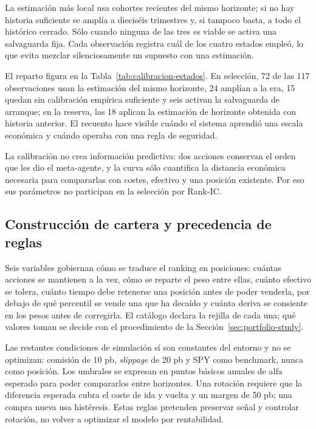 La estimación más local usa cohortes recientes del mismo horizonte; si no hay historia suficiente se
amplía a dieciséis trimestres y, si tampoco basta, a todo el histórico cerrado. Sólo cuando ninguna
de las tres es viable se activa una salvaguarda fija. Cada observación registra cuál de los cuatro
estados empleó, lo que evita mezclar silenciosamente un supuesto con una estimación.

\begin{table}[htbp]
  \centering
  \small
  \caption{Frecuencia de los estados de calibración por ventana.}
  \label{tab:calibracion-estados}
  
\end{table}

El reparto figura en la Tabla~\ref{tab:calibracion-estados}. En selección, 72 de las 117
observaciones usan la estimación del mismo horizonte, 24 amplían a la era, 15 quedan sin calibración
empírica suficiente y seis activan la salvaguarda de arranque; en la
reserva, las 18 aplican la estimación de horizonte obtenida con historia anterior. El recuento hace
visible cuándo el sistema aprendió una escala económica y cuándo operaba con una regla de seguridad.

La calibración no crea información predictiva: dos acciones conservan el orden que les dio el
meta-agente, y la curva sólo cuantifica la distancia económica necesaria para compararlas con
costes, efectivo y una posición existente. Por eso sus parámetros no participan en la selección por
Rank-IC.

\subsection{Construcción de cartera y precedencia de reglas}

Seis variables gobiernan cómo se traduce el ranking en posiciones: cuántas acciones se mantienen a
la vez, cómo se reparte el peso entre ellas, cuánto efectivo se tolera, cuánto tiempo debe retenerse
una posición antes de poder venderla, por debajo de qué percentil se vende una que ha decaído y
cuánta deriva se consiente en los pesos antes de corregirla. El catálogo declara la rejilla de cada
una; qué valores toman se decide con el procedimiento de la Sección~\ref{sec:portfolio-study}.

Las restantes condiciones de simulación sí son constantes del entorno y no se optimizan: comisión de
10 pb, \textit{slippage} de 20 pb y SPY como benchmark, nunca como posición. Los umbrales se expresan
en puntos básicos anuales de alfa esperado para poder compararlos entre horizontes. Una rotación
requiere que la diferencia esperada cubra el coste de ida y vuelta y un margen de 50 pb; una compra
nueva usa histéresis. Estas reglas pretenden preservar señal y controlar rotación, no volver a
optimizar el modelo por rentabilidad.

